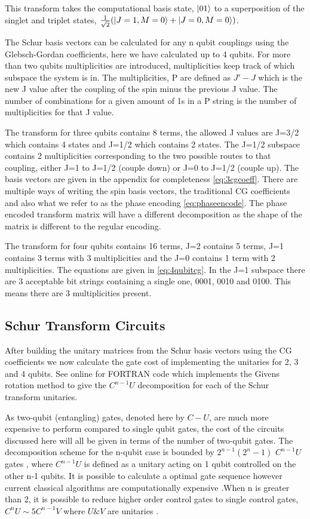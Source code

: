 \documentclass[12pt]{article}
\begin{document}
This transform takes the computational basis state, $\left\vert{01}\right\rangle$ to a superposition of the singlet and triplet states, $\frac{1}{\sqrt{2}} (\left\vert{J=1, M=0}\right\rangle + \left\vert{J=0, M=0}\right\rangle)$. 

The Schur basis vectors can be calculated for any n qubit couplings using the Glebsch-Gordan coefficients, here we have calculated up to 4 qubits. For more than two qubits multiplicities are introduced, multiplicities keep track of which subspace the system is in. The multiplicities, P are defined as $J'-J$ which is the new J value after the coupling of the spin minus the previous J value. The number of combinations for a given amount of 1s in a P string is the number of multiplicities for that J value.

The transform for three qubits contains 8 terms, the allowed J values are J=3/2 which contains 4 states and J=1/2 which contains 2 states. The J=1/2 subspace contains 2 multiplicities corresponding to the two possible routes to that coupling, either J=1 to J=1/2 (couple down) or J=0 to J=1/2 (couple up). The basis vectors are given in the appendix for completeness \autoref{eq:3cgcoeff}. There are multiple ways of writing the spin basis vectors, the traditional CG coefficients and also what we refer to as the phase encoding \autoref{eq:phaseencode}. The phase encoded transform matrix will have a different decomposition as the shape of the matrix is different to the regular encoding. 

The transform for four qubits contains 16 terms, J=2 contains 5 terms, J=1 contains 3 terms with 3 multiplicities and the J=0 contains 1 term with 2 multiplicities. The equations are given in \autoref{eq:4qubitcg}. In the J=1 subspace there are 3 acceptable bit strings containing a single one, 0001, 0010 and 0100. This means there are 3 multiplicities present. 

\subsection{Schur Transform Circuits}

After building the unitary matrices from the Schur basis vectors using the CG coefficients we now calculate the gate cost of implementing the unitaries for 2, 3 and 4 qubits. See online \cite{githubot561} for FORTRAN code which implements the Givens rotation method to give the $C^{n-1}U$ decomposition for each of the Schur transform unitaries. 

As two-qubit (entangling) gates, denoted here by $C-U$, are much more expensive to perform compared to single qubit gates, the cost of the circuits discussed here will all be given in terms of the number of two-qubit gates. The decomposition scheme for the n-qubit case is bounded by $2^{n-1}(2^n-1)$ $C^{n-1}U$ gates \cite{li2013decomposition}, where $C^{n-1}U$ is defined as a unitary acting on 1 qubit controlled on the other n-1 qubits. It is possible to calculate a optimal gate sequence however current classical algorithms are computationally expensive \cite{sridharan2010reduced}.When n is greater than 2, it is possible to reduce higher order control gates to single control gates, $C^nU \sim 5 C^{n-1}V$ where $U \& V$ are unitaries \cite{barenco1995elementary}.
\end{document}
